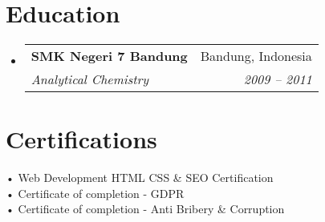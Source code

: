\documentclass[a4paper, 11pt]{article}
\makeatletter
\newcommand{\resumeSubheading}[4]{
  \vspace{-2pt}\item
    \begin{tabular*}{0.97\textwidth}[t]{l@{\extracolsep{\fill}}r}
      \textbf{#1} & #2 \\
      \textit{\small#3} & \textit{\small #4} \\
    \end{tabular*}\vspace{-7pt}
}
\newcommand{\resumeSubHeadingListStart}{\begin{itemize}[leftmargin=0.15in, label={}]}
\newcommand{\resumeSubHeadingListEnd}{\end{itemize}}
\makeatother
\begin{document}
\section{Education}
  \resumeSubHeadingListStart
    \resumeSubheading
      {SMK Negeri 7 Bandung}{Bandung, Indonesia}
      {Analytical Chemistry}{2009 -- 2011}
  \resumeSubHeadingListEnd

\section{Certifications}
  \begin{itemize}[leftmargin=0.15in, label={}]
    \small{\item{
     • Web Development HTML CSS \& SEO Certification \\
     • Certificate of completion - GDPR \\
     • Certificate of completion - Anti Bribery \& Corruption
    }}
  \end{itemize}
\end{document}
